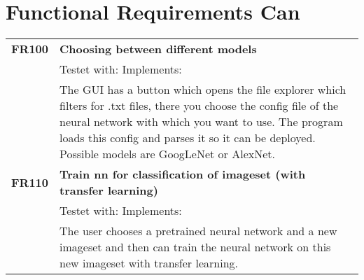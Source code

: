 \documentclass[parskip=full]{scrartcl}
\begin{document}
\section{Functional Requirements Can}
\begin{tabular}{p{2cm}p{12cm}}
\textbf{FR100} & \textbf{Choosing between different models}\\
& Testet with: Implements: \\
& The GUI has a button which opens the file explorer which filters for .txt files, there you choose the config file of the neural network with which you want to use. The program loads this config and parses it so it can be deployed. Possible models are GoogLeNet or AlexNet.\\
\textbf{FR110} & \textbf{Train nn for classification of imageset (with transfer learning)}\\
& Testet with: Implements: \\
& The user chooses a pretrained neural network and a new imageset and then can train the neural network on this new imageset with transfer learning.\\



\end{tabular}
\end{document}
